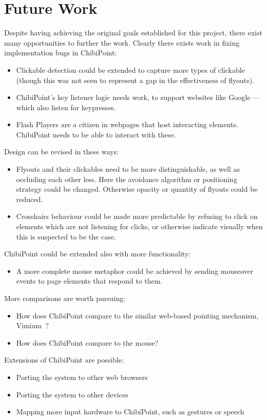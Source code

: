 \documentclass[11pt,openright,a4paper]{report}
\begin{document}
\section{Future Work}
Despite having achieving the original goals established for this project, there exist many opportunities to further the work. Clearly there exists work in fixing implementation bugs in ChibiPoint:

\begin{itemize}
\item Clickable detection could be extended to capture more types of clickable (though this was not 
seen to represent a gap in the effectiveness of flyouts).
\item ChibiPoint's key listener logic needs work, to support websites like Google --- which also listen for keypresses.
\item Flash Players are a citizen in webpages that host interacting elements. ChibiPoint needs to be able to interact with these.
\end{itemize}

Design can be revised in these ways:
\begin{itemize}
\item Flyouts and their clickables need to be more distinguishable, as well as occluding each other less. Here the avoidance algorithm or positioning strategy could be changed. Otherwise opacity or quantity of flyouts could be reduced.
\item Crosshairs behaviour could be made more predictable by refusing to click on elements which are not listening for clicks, or otherwise indicate visually when this is suspected to be the case.
\end{itemize}

ChibiPoint could be extended also with more functionality:
\begin{itemize}
\item A more complete mouse metaphor could be achieved by sending mouseover events to page elements that respond to them.
\end{itemize}

More comparisons are worth pursuing:
\begin{itemize}
\item How does ChibiPoint compare to the similar web-based pointing mechanism, Vimium~\cite{vimium}?
\item How does ChibiPoint compare to the mouse?
\end{itemize}

Extensions of ChibiPoint are possible:
\begin{itemize}
\item Porting the system to other web browsers
\item Porting the system to other devices
\item Mapping more input hardware to ChibiPoint, such as gestures or speech
\end{itemize}
\end{document}
